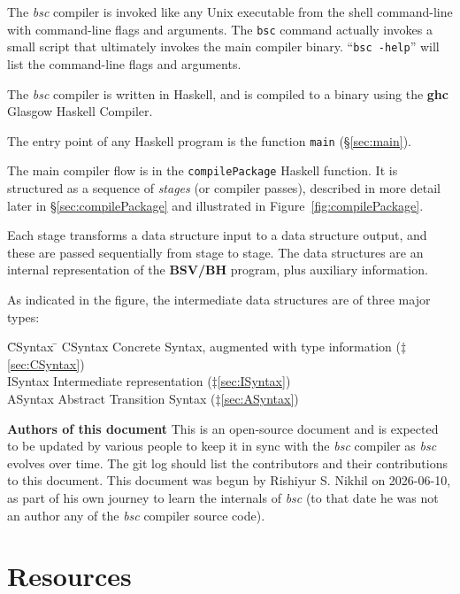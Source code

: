 \documentclass[11pt]{article}
\newcommand{\hm}{\hspace*{1em}}
\newcommand{\BSC}{{\it{}bsc}}
\newcommand{\BSVBH}{\bf{BSV/BH}}
\newcommand{\GHC}{\bf{ghc}}
\begin{document}
The {\BSC} compiler is invoked like any Unix executable from the shell
command-line with command-line flags and arguments.  The {\tt bsc}
command actually invokes a small script that ultimately invokes the
main compiler binary. ``\mbox{\tt bsc -help}'' will list the
command-line flags and arguments.

The {\BSC} compiler is written in Haskell, and is compiled to a binary
using the {\GHC} Glasgow Haskell Compiler.

The entry point of any Haskell program is the function {\tt main}
(\S\ref{sec:main}).

The main compiler flow is in the {\tt compilePackage} Haskell
function.  It is structured as a sequence of \emph{stages} (or
compiler passes), described in more detail later in
\S\ref{sec:compilePackage} and illustrated in
Figure~\ref{fig:compilePackage}.

Each stage transforms a data structure input to a data structure
output, and these are passed sequentially from stage to stage.  The
data structures are an internal representation of the {\BSVBH}
program, plus auxiliary information.

As indicated in the figure, the intermediate data structures are of
three major types:
\begin{tabbing}
\hm \= CSyntax \hm \= \kill
    \> CSyntax \hm \> Concrete Syntax, augmented with type information ($\ddagger$\ref{sec:CSyntax}) \\
    \> ISyntax \hm \> Intermediate representation ($\ddagger$\ref{sec:ISyntax}) \\
    \> ASyntax \hm \> Abstract Transition Syntax ($\ddagger$\ref{sec:ASyntax})
\end{tabbing}

\vspace{5ex}

{\bf Authors of this document} This is an open-source document and is
expected to be updated by various people to keep it in sync with the
{\BSC} compiler as {\BSC} evolves over time.  The git log should list
the contributors and their contributions to this document.  This
document was begun by Rishiyur S. Nikhil on 2026-06-10, as part of his
own journey to learn the internals of {\BSC} (to that date he was not
an author any of the {\BSC} compiler source code).


\section{Resources}
\end{document}
